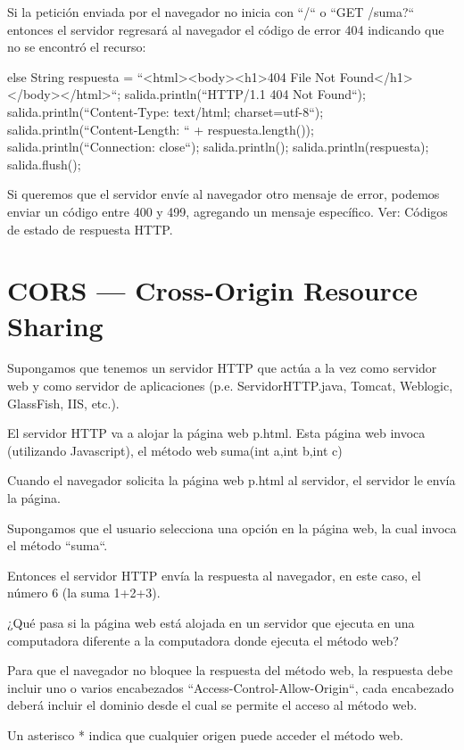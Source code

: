 Si la petición enviada por el navegador no inicia con ``/`` o ``GET /suma?`` entonces el servidor regresará al navegador el código de error 404 indicando que no se encontró el recurso:

\begin{SourceCode}
else
{
  String respuesta = ``<html><body><h1>404 File Not Found</h1></body></html>``;
  salida.println(``HTTP/1.1 404 Not Found``);
  salida.println(``Content-Type: text/html; charset=utf-8``);
  salida.println(``Content-Length: `` + respuesta.length());
  salida.println(``Connection: close``);
  salida.println();
  salida.println(respuesta);
  salida.flush();
}
\end{SourceCode}

Si queremos que el servidor envíe al navegador otro mensaje de error, podemos enviar un código entre 400 y 499, agregando un mensaje específico. Ver: Códigos de estado de respuesta HTTP.

\section{CORS — Cross-Origin Resource Sharing}

Supongamos que tenemos un servidor HTTP que actúa a la vez como servidor web y como servidor de aplicaciones (p.e. ServidorHTTP.java, Tomcat, Weblogic, GlassFish, IIS, etc.).

El servidor HTTP va a alojar la página web p.html. Esta página web invoca (utilizando Javascript), el método web suma(int a,int b,int c)

Cuando el navegador solicita la página web p.html al servidor, el servidor le envía la página.

Supongamos que el usuario selecciona una opción en la página web, la cual invoca el método ``suma``.

Entonces el servidor HTTP envía la respuesta al navegador, en este caso, el número 6 (la suma 1+2+3).

¿Qué pasa si la página web está alojada en un servidor que ejecuta en una computadora diferente a la computadora donde ejecuta el método web?

Para que el navegador no bloquee la respuesta del método web, la respuesta debe incluir uno o varios encabezados ``Access-Control-Allow-Origin``, cada encabezado deberá incluir el dominio desde el cual se permite el acceso al método web.

Un asterisco * indica que cualquier origen puede acceder el método web.


